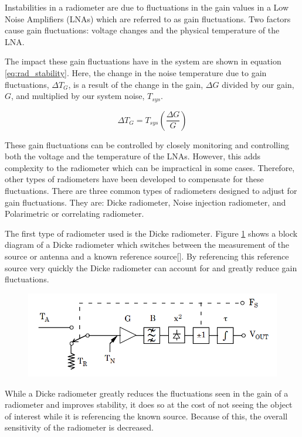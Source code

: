 Instabilities in a radiometer are due to fluctuations in the gain values in a Low Noise Amplifiers (LNAs) which are referred to as gain fluctuations.  Two factors cause gain fluctuations: voltage changes and the physical temperature of the LNA.  

The impact these gain fluctuations have in the system are shown in equation \ref{eq:rad_stability}.  Here, the change in the noise temperature due to gain fluctuations, $\Delta T_{G}$, is a result of the change in the gain, $\Delta G$ divided by our gain, $G$, and multiplied by our system noise, $T_{sys}$.  

\begin{equation} \label{eq:rad_stability}
\Delta T_G=T_{sys} \left(\frac{\Delta G}{G}\right)
\end{equation}

These gain fluctuations can be controlled by closely monitoring and controlling both the voltage and the temperature of the LNAs. However, this adds complexity to the radiometer which can be impractical in some cases.  Therefore, other types of radiometers have been developed to compensate for these fluctuations.  There are three common types of radiometers designed to adjust for gain fluctuations.  They are: Dicke radiometer, Noise injection radiometer, and Polarimetric or correlating radiometer.

The first type of radiometer used is the Dicke radiometer.  Figure \ref{dicke_radiometer} shows a block diagram of a Dicke radiometer which switches between the measurement of the source or antenna and a known reference source[\cite{Dicke}].  By referencing this reference source very quickly the Dicke radiometer can account for and greatly reduce gain fluctuations.  

{\begin{figure}[h!tb] 
\centering
\includegraphics[width=\textwidth]{Images/Dicke_block.png}
\label{dicke_radiometer}
\end{figure}
}

While a Dicke radiometer greatly reduces the fluctuations seen in the gain of a radiometer and improves stability, it does so at the cost of not seeing the object of interest while it is referencing the known source.  Because of this, the overall sensitivity of the radiometer is decreased.

